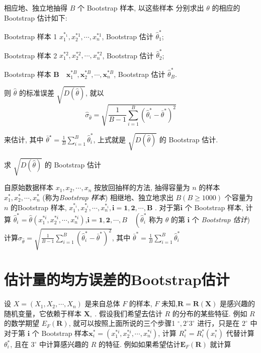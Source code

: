 相应地、独立地抽得 $ B $ 个 Bootstrap 样本, 以这些样本 分别求出 $ \theta $ 的相应的 Bootstrap 估计如下:

Bootstrap 样本 1 $ x_{1}^{*_{1}}, x_{2}^{* 1}, \cdots, x_{n}^{* 1} $, Bootstrap 估计 $ \hat{\theta}_{1}^{*} $;

Bootstrap 样本 2 $ x_{1}^{* 2}, x_{2}^{* 2}, \cdots, x_{n}^{* 2} $, Bootstrap 估计 $ \hat{\theta}_{2}^{*} $;

Bootstrap 样本 $ \boldsymbol{B} \quad \boldsymbol{x}_{1}^{* B}, \boldsymbol{x}_{2}^{* B}, \cdots, \boldsymbol{x}_{n}^{* B} $, Bootstrap 估计 $ \hat{\theta}_{B}^{*} $.

则 $ \hat{\theta} $ 的标准误差 $ \sqrt{D(\hat{\theta})} $, 就以
$$
\hat{\sigma}_{\hat{\theta}}=\sqrt{\frac{1}{B-1} \sum_{i=1}^{B}\left(\hat{\theta}_{i}^{*}-\bar{\theta}^{*}\right)^{2}}
$$

来估计, 其中 $ \bar{\theta}^{\star}=\frac{1}{B} \sum_{i=1}^{B} \hat{\theta}_{i}^{*} $, 上式就是 $ \sqrt{D(\hat{\theta})} $ 的 Bootstrap 估计. 

\begin{algorithm}
    \caption{求 $ \sqrt{D(\hat{\theta})} $ 的 Bootstrap 估计}
    自原始数据样本 $ x_{1}, x_{2}, \cdots, x_{n} $ 按放回抽样的方法, 抽得容量为 $ n $ 的样本 $ x_{1}^{*}, x_{2}^{*}, \cdots, x_{n}^{*} $ (称为\textit{Bootstrap 样本})\;
    相继地、独立地求出 $ B(B \geq 1000) $ 个容量为 $ n $ 的Bootstrap 样本, $ x_{1}^{*_{i}}, x_{2}^{*_{i}}, \cdots, x_{n}^{*_{i}}, \boldsymbol{i}=\mathbf{1}, \mathbf{2}, \cdots, \boldsymbol{B} $ .  对于第$ \boldsymbol{i} $ 个 Bootstrap 样本, 计算 $ \hat{\theta}_{i}^{*}=\hat{\theta}\left(x_{1}^{* i}, x_{2}^{* i}, \cdots, x_{n}^{* i}\right) $,$ \boldsymbol{i}=\mathbf{1}, \mathbf{2}, \cdots, B \quad\left(\hat{\theta}_{i}^{*}\right. $ 称为 $ \theta $ 的第 $ \boldsymbol{i} $ 个 \textit{Bootstrap 估计})\;
    计算$ \hat{\sigma}_{\hat{\theta}}=\sqrt{\frac{1}{B-1} \sum_{i=1}^{B}\left(\hat{\theta}_{i}^{*}-\bar{\theta}^{*}\right)^{2}} $, 其中 $ \bar{\theta}^{*}=\frac{1}{B} \sum_{i=1}^{B} \hat{\theta}_{i}^{*} $
\end{algorithm}

\section{估计量的均方误差的Bootstrap估计}

设 $ X=\left(X_{1}, X_{2}, \cdots, X_{n}\right) $ 是来自总体 $ F $ 的样本, $ F $ 未知,$ \boldsymbol{R}=\boldsymbol{R}(\boldsymbol{X}) $ 是感兴趣的随机变量，它依赖于样本 $ \boldsymbol{X}_{\circ} $ . 假设我们希望去估计 $ R $ 的分布的某些特征. 例如 $ R $ 的数学期望 $ E_{F}(\boldsymbol{R}) $, 就可以按照上面所说的三个步骤1 $ ^{\circ}, 2^{\circ} $$ 3^{\circ} $ 进行，只是在 $ 2^{\circ} $ 中对于第 $ \boldsymbol{i} $ 个 Bootstrap 样本$ \boldsymbol{x}_{i}^{*}=\left(x_{1}^{* i}, x_{2}^{* i}, \cdots, x_{n}^{* i}\right) $, 计算 $ R_{i}^{*}=R_{i}^{*}\left(x_{i}^{*}\right) $ 代替计算 $ \theta_{i}^{*} $, 且在 $ 3^{\circ} $ 中计算感兴趣的 $ R $ 的特征. 例如如果希望估计$ \boldsymbol{E}_{F}(\boldsymbol{R}) $ 就计算

